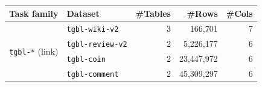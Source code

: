 \documentclass{article} %
\newcommand{\mr}[2]{\multirow{#1}{*}{#2}}
\begin{document}
\begin{table}[t]
    \renewcommand{\arraystretch}{1.1}                                                                                                                                                                                                                        
    \begin{tabular}{llrrr}                                                                                                                                                                                                                                   
      \toprule                                                                                                                                                                                                                                               
      Task family & Dataset & \#Tables & \#Rows & \#Cols \\                                                                                                                                                                                                  
      \midrule                                                                                                                                                                                                                                               
      \mr{5}{\texttt{tgbl-*} (link)} &                                                                                                                                                                                                                       
        \texttt{tgbl-wiki-v2}   & 3  & 166,701    & 7  \\                                                                                                                                                                                                    
      & \texttt{tgbl-review-v2} & 2  & 5,226,177  & 6  \\                                                                                                                                                                                                    
      & \texttt{tgbl-coin}      & 2  & 23,447,972 & 6  \\                                                                                                                                                                                                    
      & \texttt{tgbl-comment}   & 2  & 45,309,297 & 6  \\                                                                                                                                                                                                    

\end{tabular}
\end{table}
\end{document}
